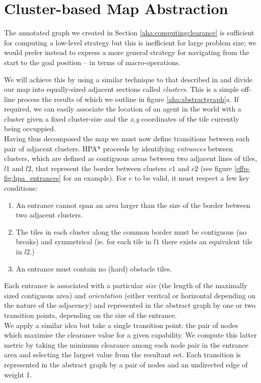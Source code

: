 \section{Cluster-based Map Abstraction}
\label{aha:mapabstraction}
The annotated graph we created in Section \ref{aha:computingclearance} is sufficient for computing a low-level strategy but this is inefficient for large problem size; we would prefer instead to express a more general strategy for navigating from the start to the goal position -- in terms of macro-operations.

We will achieve this by using a similar technique to that described in \cite{botea04} and divide our map into equally-sized adjacent sections called \emph{clusters}. This is a simple off-line process the results of which we outline in figure \ref{aha:abstractgraph}a. If required, we can easily associate the location of an agent in the world with a cluster given a fixed cluster-size and the \emph{x,y} coordinates of the tile currently being occuppied.\\ \newline
Having thus decomposed the map we must now define transitions between each pair of adjacent clusters. HPA* proceeds by identifying \emph{entrances} between clusters, which are defined as contiguous areas between two adjacent lines of tiles, $l1$ and $l2$, that represent the border between clusters $c1$ and $c2$ (see figure \ref{effp-fig:hpa_entrances} for an example). For $e$ to be valid, it must respect a few key conditions:
\begin{enumerate}
\item{An entrance cannot span an area larger than the size of the border between two adjacent clusters.}
\item{The tiles in each cluster along the common border must be contiguous (no breaks) and symmetrical (ie. for each tile in $l1$ there exists an equivalent tile in $l2$.)}
\item{An entrance must contain no (hard) obstacle tiles.}
\end{enumerate}
Each entrance is associated with a particular \emph{size} (the length of the maximally sized contiguous area) and \emph{orientation} (either veritcal or horizontal depending on the nature of the adjacency) and represented in the abstract graph by one or two transition points, depending on the size of the entrance. \\ \newline
We apply a similar idea but take a single transition point: the pair of nodes which maximise the clearance value for a given capability. We compute this latter metric by taking the minimum clearance among each node pair in the entrance area and selecting the largest value from the resultant set. Each transition is represented in the abstract graph by a pair of nodes and an undirected edge of weight 1.\\
